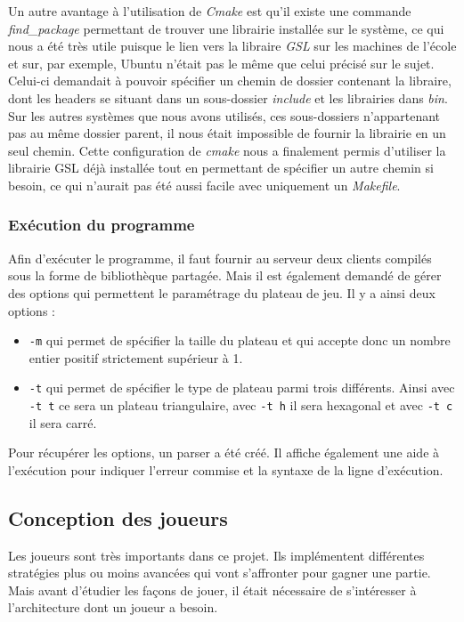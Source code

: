 \documentclass[a4paper, 12pt]{article}
\begin{document}
Un autre avantage à l'utilisation de \emph{Cmake} est qu'il existe une commande \emph{find\_package} permettant de trouver une librairie installée sur le système, ce qui nous a été très utile puisque le lien vers la libraire \emph{GSL} sur les machines de l'école et sur, par exemple, Ubuntu n'était pas le même que celui précisé sur le sujet. Celui-ci demandait à pouvoir spécifier un chemin de dossier contenant la libraire, dont les headers se situant dans un sous-dossier \emph{include} et les librairies dans \emph{bin}. Sur les autres systèmes que nous avons utilisés, ces sous-dossiers n'appartenant pas au même dossier parent, il nous était impossible de fournir la librairie en un seul chemin. Cette configuration de \emph{cmake} nous a finalement permis d'utiliser la librairie GSL déjà installée tout en permettant de spécifier un autre chemin si besoin, ce qui n'aurait pas été aussi facile avec uniquement un \emph{Makefile}.

\subsubsection{Exécution du programme}
\label{part:opt}
Afin d'exécuter le programme, il faut fournir au serveur deux clients compilés sous la forme de bibliothèque partagée. Mais il est également demandé de gérer des options qui permettent le paramétrage du plateau de jeu. Il y a ainsi deux options :
\begin{itemize}[label=\textbullet]
\item \texttt{-m} qui permet de spécifier la taille du plateau et qui accepte donc un nombre entier positif strictement supérieur à 1.
\item \texttt{-t} qui permet de spécifier le type de plateau parmi trois différents. Ainsi avec \texttt{-t t} ce sera un plateau triangulaire, avec \texttt{-t h} il sera hexagonal et avec \texttt{-t c} il sera carré.
\end{itemize}

Pour récupérer les options, un parser a été créé. Il affiche également une aide à l'exécution pour indiquer l'erreur commise et la syntaxe de la ligne d'exécution.

\subsection{Conception des joueurs}
\label{spart:j}
Les joueurs sont très importants dans ce projet. Ils implémentent différentes stratégies plus ou moins avancées qui vont s'affronter pour gagner une partie. Mais avant d'étudier les façons de jouer, il était nécessaire de s'intéresser à l'architecture dont un joueur a besoin.
\end{document}
